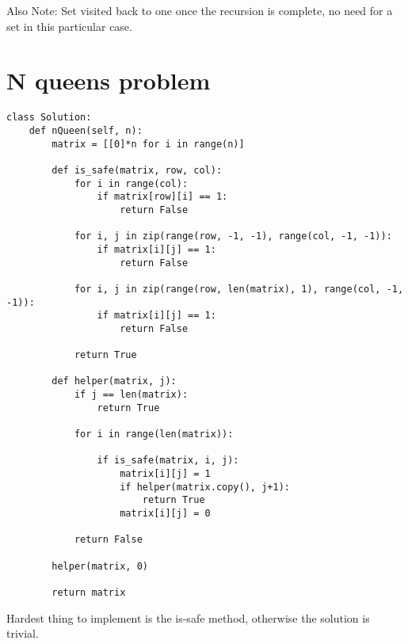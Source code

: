 \documentclass[a4]{article}
\begin{document}
Also Note: Set visited back to one once the recursion is complete, no need for a set in this particular case.


\newpage
\section{N queens problem}
\begin{lstlisting}
class Solution:
    def nQueen(self, n):
        matrix = [[0]*n for i in range(n)]

        def is_safe(matrix, row, col):
            for i in range(col):
                if matrix[row][i] == 1:
                    return False

            for i, j in zip(range(row, -1, -1), range(col, -1, -1)):
                if matrix[i][j] == 1:
                    return False

            for i, j in zip(range(row, len(matrix), 1), range(col, -1, -1)):
                if matrix[i][j] == 1:
                    return False

            return True

        def helper(matrix, j):
            if j == len(matrix):
                return True

            for i in range(len(matrix)):

                if is_safe(matrix, i, j):
                    matrix[i][j] = 1
                    if helper(matrix.copy(), j+1):
                        return True
                    matrix[i][j] = 0

            return False

        helper(matrix, 0)
        
        return matrix
\end{lstlisting}
Hardest thing to implement is the is-safe method, otherwise the solution is trivial.

\newpage
\end{document}
